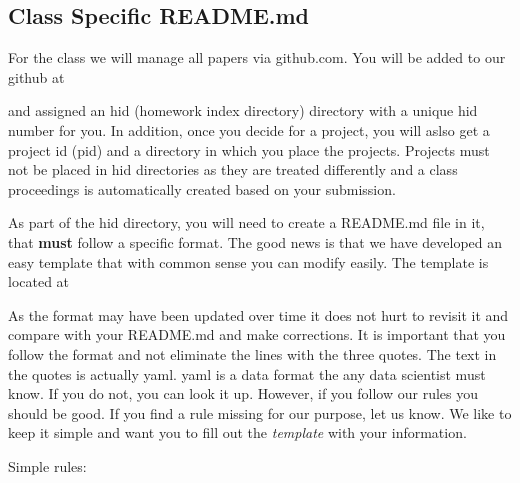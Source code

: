 \subsection{Class Specific README.md}\label{class-specific-readme.md}

For the class we will manage all papers via github.com. You will be
added to our github at


and assigned an hid (homework index directory) directory with a unique
hid number for you. In addition, once you decide for a project, you will
aslso get a project id (pid) and a directory in which you place the
projects. Projects must not be placed in hid directories as they are
treated differently and a class proceedings is automatically created
based on your submission.

As part of the hid directory, you will need to create a README.md file
in it, that \textbf{must} follow a specific format. The good news is
that we have developed an easy template that with common sense you can
modify easily. The template is located at


As the format may have been updated over time it does not hurt to
revisit it and compare with your README.md and make corrections. It is
important that you follow the format and not eliminate the lines with
the three quotes. The text in the quotes is actually yaml. yaml is a
data format the any data scientist must know. If you do not, you can
look it up. However, if you follow our rules you should be good. If you
find a rule missing for our purpose, let us know. We like to keep it
simple and want you to fill out the \emph{template} with your
information.

Simple rules:


